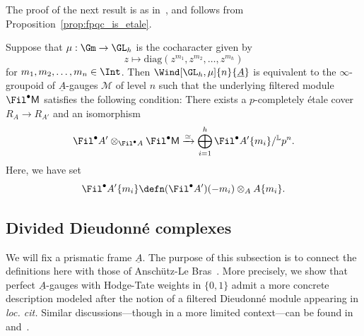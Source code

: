 \documentclass[10pt]{amsart}
\begin{document}
The proof of the next result is as in~\cite[Example 5.3.5]{MR4355476}, and follows from Proposition~\ref{prop:fpqc_is_etale}.
\begin{proposition}
\label{prop:abstract_f-gauge_gl_n}
Suppose that $\mu:\Gm\to \GL_h$ is the cocharacter given by
\[
z\mapsto \mathrm{diag}(z^{m_1},z^{m_2},\ldots,z^{m_h})
\]
for $m_1,m_2,\ldots,m_n\in \Int$. Then $\Wind[\GL_h,\mu]{n}{\underline{A}}$ is equivalent to the $\infty$-groupoid of $\underline{A}$-gauges $\mathcal{M}$ of level $n$ such that the underlying filtered module $\Fil^\bullet\mathsf{M}$ satisfies the following condition: There exists a $p$-completely \'etale cover ${R_A}\to{R_{A'}}$ and an isomorphism
\[
\Fil^\bullet A'\otimes_{\Fil^\bullet A}\Fil^\bullet \mathsf{M} \xrightarrow{\simeq}\bigoplus_{i=1}^h \Fil^\bullet A'\{m_i\}/{}^{\mathbb{L}}p^n.
\]
Here, we have set
\[
\Fil^\bullet A'\{m_i\} \defn (\Fil^\bullet A')(-m_i)\otimes_AA\{m_i\}.
\]
\end{proposition} 



\subsection{Divided Dieudonn\'e complexes}
\label{subsec:alb}
We will fix a prismatic frame $\underline{A}$. The purpose of this subsection is to connect the definitions here with those of Ansch\"utz-Le Bras~\cite{MR4530092}. More precisely, we show that perfect $\underline{A}$-gauges with Hodge-Tate weights in $\{0,1\}$ admit a more concrete description modeled after the notion of a filtered Dieudonn\'e module appearing in \emph{loc. cit.} Similar discussions---though in a more limited context---can be found in~\cite{guo2023frobenius} and~\cite{Mondal2024-cy}.
\end{document}
